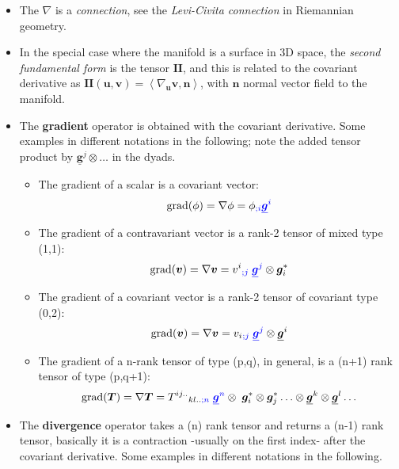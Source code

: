 \documentclass{digitaldynamics}
\def\vect#1{\bm{#1}}
\def\vcovar#1{{\bm{#1}}^*}
\def\vcontr#1{\underline{\bm{#1}}}
\def\tensor#1{\bm{#1}}
\begin{document}
\begin{itemize}
	\item The $\nabla$ is a \textit{connection}, see the \textit{Levi-Civita connection} in Riemannian geometry.  
	
	\item In the special case where the manifold is a surface in 3D space, the \textit{second fundamental form} is the tensor $\tensor{I\!I}$, and this 
	is related to the covariant derivative as 
	$\tensor{I\!I}(\vect{u},\vect{v}) = \left\langle \nabla_{\vect{u}} \vect{v}, \vect{n} \right\rangle$, 
	with $\vect{n}$ normal vector field to the manifold.
	
	
	
	\item The \textbf{gradient} operator is obtained with the covariant derivative.
	Some examples in different notations in the following; note the added tensor product by $\vcontr{g}^{j} \otimes \ldots$ in the dyads.
	
	\begin{itemize}
		\item The gradient of a scalar is a covariant vector:
		\[
				 \mathrm{grad}(\phi) = \nabla \phi = \phi_{\textcolor{blue}{;i}} \textcolor{blue}{\vcontr{g}^{i}}
		\]
		
		\item The gradient of a contravariant vector is a rank-2 tensor of mixed type (1,1):
		\[
				 \mathrm{grad}(\vect{v}) = \nabla \vect{v} = v^i{}_{\textcolor{blue}{;j}} \; \textcolor{blue}{\vcontr{g}^{j}} \otimes \vcovar{g}_{i}
		\]
		
		\item The gradient of a covariant vector is a rank-2 tensor of covariant type (0,2):
		\[
				 \mathrm{grad}(\vect{v}) = \nabla \vect{v} = v_i{}_{\textcolor{blue}{;j}} \; \textcolor{blue}{\vcontr{g}^{j}} \otimes \vcontr{g}^{i}
		\]
		
		\item The gradient of a n-rank tensor of type (p,q), in general, is a (n+1) rank tensor of type (p,q+1):
		\[
					\mathrm{grad}(\tensor{T}) = \nabla \tensor{T}  = T^{ij..}{}_{kl.. \textcolor{blue}{;n}} \; \textcolor{blue}{\vcontr{g}^n} \otimes \; \vcovar{g}_i \otimes \vcovar{g}_j \ldots \otimes \vcontr{g}^k \otimes \vcontr{g}^l \ldots
		\]
	\end{itemize}


	
	\item The \textbf{divergence} operator takes a (n) rank tensor and returns a (n-1) rank tensor, 
	basically it is a contraction -usually on the first index- after the covariant derivative.
	Some examples in different notations in the following.
	

\end{itemize}
\end{document}
